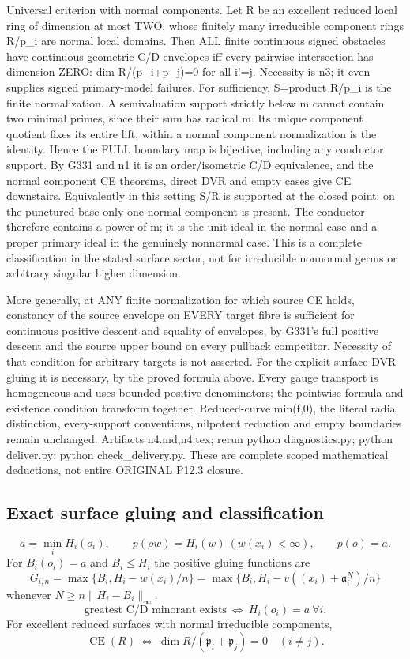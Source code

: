 Universal criterion with normal components. Let R be an excellent reduced local ring of dimension at most TWO, whose finitely many irreducible component rings R/p\_i are normal local domains. Then ALL finite continuous signed obstacles have continuous geometric C/D envelopes iff every pairwise intersection has dimension ZERO: dim R/(p\_i+p\_j)=0 for all i!=j. Necessity is n3; it even supplies signed primary-model failures. For sufficiency, S=product R/p\_i is the finite normalization. A semivaluation support strictly below m cannot contain two minimal primes, since their sum has radical m. Its unique component quotient fixes its entire lift; within a normal component normalization is the identity. Hence the FULL boundary map is bijective, including any conductor support. By G331 and n1 it is an order/isometric C/D equivalence, and the normal component CE theorems, direct DVR and empty cases give CE downstairs. Equivalently in this setting S/R is supported at the closed point: on the punctured base only one normal component is present. The conductor therefore contains a power of m; it is the unit ideal in the normal case and a proper primary ideal in the genuinely nonnormal case. This is a complete classification in the stated surface sector, not for irreducible nonnormal germs or arbitrary singular higher dimension.

More generally, at ANY finite normalization for which source CE holds, constancy of the source envelope on EVERY target fibre is sufficient for continuous positive descent and equality of envelopes, by G331's full positive descent and the source upper bound on every pullback competitor. Necessity of that condition for arbitrary targets is not asserted. For the explicit surface DVR gluing it is necessary, by the proved formula above. Every gauge transport is homogeneous and uses bounded positive denominators; the pointwise formula and existence condition transform together. Reduced-curve min(f,0), the literal radial distinction, every-support conventions, nilpotent reduction and empty boundaries remain unchanged. Artifacts n4.md,n4.tex; rerun python diagnostics.py; python deliver.py; python check\_delivery.py. These are complete scoped mathematical deductions, not entire ORIGINAL P12.3 closure.

\subsection*{Exact surface gluing and classification}
\[
 a=\min_i H_i(o_i),\qquad
 p(\rho w)=H_i(w)\ (w(x_i)<\infty),\qquad p(o)=a.
\]
For $B_i(o_i)=a$ and $B_i\le H_i$ the positive gluing functions are
\[
 G_{i,n}=\max\{B_i,H_i-w(x_i)/n\}
 =\max\{B_i,H_i-v((x_i)+\mathfrak a_i^N)/n\}
\]
whenever $N\ge n\|H_i-B_i\|_\infty$.
\[
 \text{greatest C/D minorant exists}\ \Longleftrightarrow\ H_i(o_i)=a\ \forall i.
\]
For excellent reduced surfaces with normal irreducible components,
\[
 \operatorname{CE}(R)\ \Longleftrightarrow\
 \dim R/(\mathfrak p_i+\mathfrak p_j)=0\quad(i\ne j).
\]

